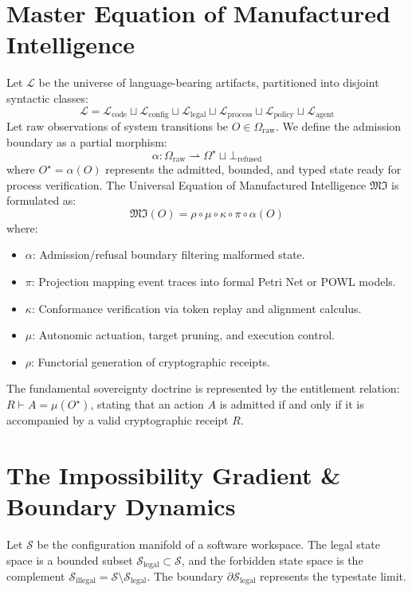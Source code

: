 \documentclass[11pt,a4paper,oneside]{book}
\begin{document}
\section{Master Equation of Manufactured Intelligence}
Let $\mathcal{L}$ be the universe of language-bearing artifacts, partitioned into disjoint syntactic classes:
\[
\mathcal{L} = \mathcal{L}_{\mathrm{code}} \sqcup \mathcal{L}_{\mathrm{config}} \sqcup \mathcal{L}_{\mathrm{legal}} \sqcup \mathcal{L}_{\mathrm{process}} \sqcup \mathcal{L}_{\mathrm{policy}} \sqcup \mathcal{L}_{\mathrm{agent}}
\]
Let raw observations of system transitions be $O \in \Omega_{\mathrm{raw}}$. We define the admission boundary as a partial morphism:
\[
\alpha: \Omega_{\mathrm{raw}} \rightharpoonup \Omega^{\star} \sqcup \bot_{\mathrm{refused}}
\]
where $O^{\star} = \alpha(O)$ represents the admitted, bounded, and typed state ready for process verification. The Universal Equation of Manufactured Intelligence $\mathfrak{MI}$ is formulated as:
\[
\boxed{ \mathfrak{MI}(O) = \rho \circ \mu \circ \kappa \circ \pi \circ \alpha (O) }
\]
where:
\begin{itemize}
    \item $\alpha$: Admission/refusal boundary filtering malformed state.
    \item $\pi$: Projection mapping event traces into formal Petri Net or POWL models.
    \item $\kappa$: Conformance verification via token replay and alignment calculus.
    \item $\mu$: Autonomic actuation, target pruning, and execution control.
    \item $\rho$: Functorial generation of cryptographic receipts.
\end{itemize}
The fundamental sovereignty doctrine is represented by the entitlement relation: $\boxed{ R \vdash A = \mu(O^{\star}) }$, stating that an action $A$ is admitted if and only if it is accompanied by a valid cryptographic receipt $R$.

\section{The Impossibility Gradient \& Boundary Dynamics}
Let $\mathcal{S}$ be the configuration manifold of a software workspace. The legal state space is a bounded subset $\mathcal{S}_{\mathrm{legal}} \subset \mathcal{S}$, and the forbidden state space is the complement $\mathcal{S}_{\mathrm{illegal}} = \mathcal{S} \setminus \mathcal{S}_{\mathrm{legal}}$. The boundary $\partial \mathcal{S}_{\mathrm{legal}}$ represents the typestate limit.
\end{document}
